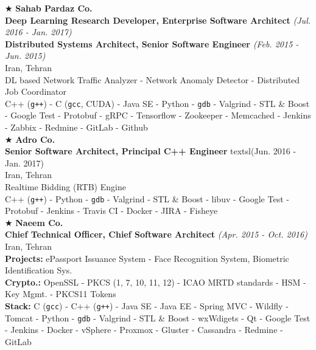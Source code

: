 \documentclass[10pt,a4paper]{article}
\begin{document}
\noindent $\bigstar$ \hspace{0.1cm} \large \textbf{Sahab Pardaz Co.} \\
\indent \small \textbf{Deep Learning Research Developer, Enterprise Software Architect} \textsl{(Jul. 2016 - Jan. 2017)} \\
\indent \small \textbf{Distributed Systems Architect, Senior Software Engineer} \textsl{(Feb. 2015 - Jun. 2015)} \\
\indent \textnormal{Iran, Tehran} \\
\indent \textbullet \hspace{0.05cm} DL based Network Traffic Analyzer - Network Anomaly Detector - Distributed Job Coordinator\\
\indent \textbullet \hspace{0.05cm} C++ (\texttt{g++}) - C (\texttt{gcc}, CUDA) - Java SE - Python - \texttt{gdb} - Valgrind - STL \& Boost - Google Test - Protobuf - gRPC - Tensorflow - Zookeeper - Memcached - Jenkins - Zabbix - Redmine - GitLab - Github \\

\noindent $\bigstar$ \hspace{0.1cm} \large \textbf{Adro Co.} \\
\indent \small \textbf{Senior Software Architect, Principal C++ Engineer} textsl{(Jun. 2016 - Jan. 2017)} \\
\indent \textnormal{Iran, Tehran} \\
\indent \textbullet \hspace{0.05cm} Realtime Bidding (RTB) Engine \\
\indent \textbullet \hspace{0.05cm} C++ (\texttt{g++}) - Python - \texttt{gdb} - Valgrind - STL \& Boost - libuv - Google Test - Protobuf - Jenkins - Travis CI - Docker - JIRA - Fisheye \\

\noindent $\bigstar$ \hspace{0.1cm} \large \textbf{Naeem Co.} \\
\indent \small \textbf{Chief Technical Officer, Chief Software Architect} \textsl{(Apr. 2015 - Oct. 2016)} \\
\indent \textnormal{Iran, Tehran} \\
\indent \textbullet \hspace{0.05cm} \textbf{Projects:} ePassport Issuance System - Face Recognition System, Biometric Identification Sys. \\
\indent \textbullet \hspace{0.05cm} \textbf{Crypto.:} OpenSSL - PKCS (1, 7, 10, 11, 12) - ICAO MRTD standards - HSM - Key Mgmt. - PKCS11 Tokens\\
\indent \textbullet \hspace{0.05cm} \textbf{Stack:} C (\texttt{gcc}) - C++ (\texttt{g++}) - Java SE - Java EE - Spring MVC - Wildfly - Tomcat - Python - \texttt{gdb} - Valgrind - STL \& Boost - wxWdigets - Qt - Google Test - Jenkins - Docker - vSphere - Proxmox - Gluster - Cassandra - Redmine - GitLab \\
\end{document}
